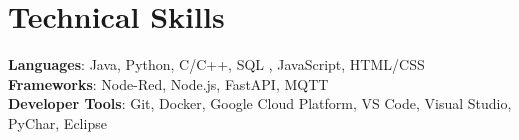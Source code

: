 \documentclass[letterpaper,11pt]{article}
\begin{document}
%
\section{Technical Skills}
 \begin{itemize}[leftmargin=0.15in, label={}]
    \small{\item{
     \textbf{Languages}{: Java, Python, C/C++, SQL , JavaScript, HTML/CSS} \\
     \textbf{Frameworks}{: Node-Red, Node.js, FastAPI, MQTT} \\
     \textbf{Developer Tools}{: Git, Docker,  Google Cloud Platform, VS Code, Visual Studio, PyChar, Eclipse} \\
    }}
 \end{itemize}


\end{document}
